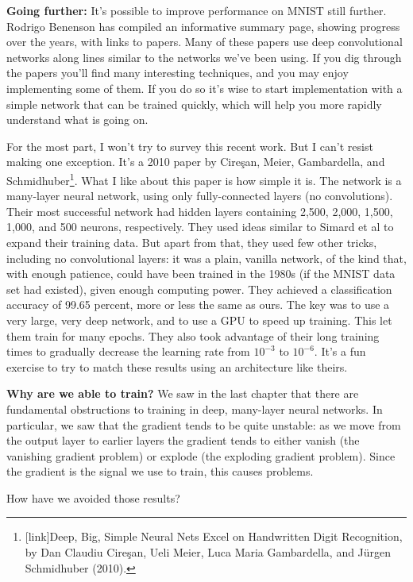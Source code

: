 \documentclass[a4paper,twoside,10pt]{book}
\begin{document}
\textbf{Going further:} It's possible to improve performance on MNIST still further. Rodrigo Benenson has compiled an informative summary page, showing progress over the years, with links to papers. Many of these papers use deep convolutional networks along lines similar to the networks we've been using. If you dig through the papers you'll find many interesting techniques, and you may enjoy implementing some of them. If you do so it's wise to start implementation with a simple network that can be trained quickly, which will help you more rapidly understand what is going on.

For the most part, I won't try to survey this recent work. But I can't resist making one exception. It's a 2010 paper by Cire\c{s}an, Meier, Gambardella, and Schmidhuber\footnote{[link]Deep, Big, Simple Neural Nets Excel on Handwritten Digit Recognition, by Dan Claudiu Cire\c{s}an, Ueli Meier, Luca Maria Gambardella, and J\"urgen Schmidhuber (2010).}. What I like about this paper is how simple it is. The network is a many-layer neural network, using only fully-connected layers (no convolutions). Their most successful network had hidden layers containing 2,500, 2,000, 1,500, 1,000, and 500 neurons, respectively. They used ideas similar to Simard et al to expand their training data. But apart from that, they used few other tricks, including no convolutional layers: it was a plain, vanilla network, of the kind that, with enough patience, could have been trained in the 1980s (if the MNIST data set had existed), given enough computing power. They achieved a classification accuracy of 99.65 percent, more or less the same as ours. The key was to use a very large, very deep network, and to use a GPU to speed up training. This let them train for many epochs. They also took advantage of their long training times to gradually decrease the learning rate from $10^{-3}$ to $10^{-6}$. It's a fun exercise to try to match these results using an architecture like theirs.

\textbf{Why are we able to train?} We saw in the last chapter that there are fundamental obstructions to training in deep, many-layer neural networks. In particular, we saw that the gradient tends to be quite unstable: as we move from the output layer to earlier layers the gradient tends to either vanish (the vanishing gradient problem) or explode (the exploding gradient problem). Since the gradient is the signal we use to train, this causes problems.

How have we avoided those results?
\end{document}
